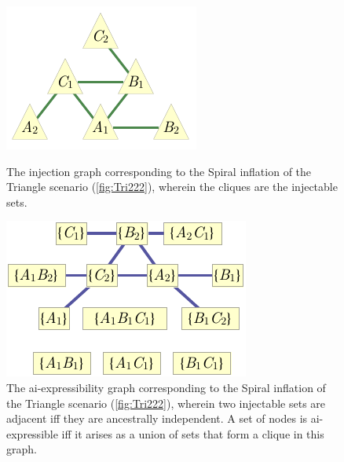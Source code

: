 \documentclass[aps,english,10pt,superscriptaddress,onecolumn,twoside,longbibliography,pra,floatfix,fleqn,nofootinbib]{revtex4-1}
\theoremstyle{definition}
\begin{document}
\begin{figure}[t]
\centering
\begin{minipage}[t]{0.3\linewidth}
\centering
\includegraphics[scale=1]{injectiongraph222.pdf}
\caption{The injection graph corresponding to the Spiral inflation of the Triangle scenario (\cref{fig:Tri222}), wherein the cliques are the injectable sets.
}\label{fig:injection222}
\end{minipage}
\hfill
\begin{minipage}[t]{0.3\linewidth}
\centering
\includegraphics[scale=1]{preinjectiongraph222.pdf}
\caption{The ai-expressibility graph corresponding to the  Spiral inflation of the Triangle scenario (\cref{fig:Tri222}), wherein two injectable sets are adjacent iff they are ancestrally independent. A set of nodes is ai-expressible iff it arises as a union of sets that form a clique in this graph.}\label{fig:preinjectiongraph222}
\end{minipage}
\hfill
\begin{minipage}[t]{0.3\linewidth}
\centering

\end{minipage}
\end{figure}
\end{document}
